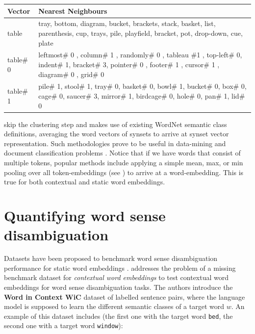 \documentclass[a4paper,12pt,oneside,openright]{report}
\begin{document}
\begin{table}[h]
    \centering
    \begin{tabularx}{\textwidth}{p{50pt}|b}
    \toprule
      {\textbf{Vector}} & {\textbf{Nearest Neighbours}}  \\ \midrule
        table & tray, bottom, diagram, bucket, brackets, stack, basket, list, parenthesis, cup, trays, pile, playfield, bracket, pot, drop-down, cue, plate \\ \hline
        table\# 0 & leftmost\# 0 , column\# 1 , randomly\# 0 , tableau \#1 , top-left\# 0, indent\# 1, bracket\# 3, pointer\# 0 , footer\# 1 , cursor\# 1 , diagram\# 0 , grid\# 0      \\ \hline
        table\# 1 & pile\# 1, stool\# 1, tray\# 0, basket\# 0, bowl\# 1, bucket\# 0, box\# 0, cage\# 0, saucer\# 3, mirror\# 1, birdcage\# 0, hole\# 0, pan\# 1, lid\# 0    \\ \hline
    \end{tabularx}
\end{table}

\cite{remus18} skip the clustering step and makes use of existing WordNet semantic class definitions, averaging the word vectors of synsets to arrive at synset vector representation.
Such methodologies prove to be useful in data-mining and document classification problems \cite{reimers19}.
Notice that if we have words that consist of multiple tokens, popular methods include applying a simple mean, max, or min pooling over all token-embeddings (see \cite{bommasani19, akbik19, may19}) to arrive at a word-embedding. 
This is true for both contextual and static word embeddings. \\

\section{Quantifying word sense disambiguation}

Datasets have been proposed to benchmark word sense disambiguation performance for static word embeddings \cite{bruni13, hill15}.
\cite{pilehvar19} addresses the problem of a missing benchmark dataset for \textit{contextual word embeddings} to test contextual word embeddings for word sense disambiguation tasks.
The authors introduce the \textbf{Word in Context WiC} dataset of labelled sentence pairs, where the language model is supposed to learn the different semantic classes of a target word $w$. 
An example of this dataset includes (the first one with the target word \Verb#bed#, the second one with a target word \Verb#window#): \\
\end{document}
